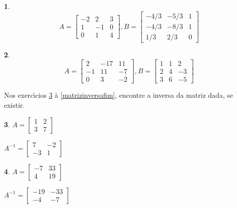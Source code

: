 \documentclass[12pt]{exam}
\newtheorem{exercicio}{}
\begin{document}
\begin{exercicio}
\[
  A =\begin{bmatrix}
    -2 & 2 & 3\\
    1 & -1 & 0\\
    0 & 1 & 4
  \end{bmatrix}, B =\begin{bmatrix}
    -4/3 & -5/3 & 1\\
    -4/3 & -8/3 & 1\\
    1/3 & 2/3 & 0
  \end{bmatrix}
\]
\end{exercicio}

\begin{exercicio}\label{matrizfim}
\[
  A =\begin{bmatrix}
    2 & -17 & 11\\
    -1 & 11 & -7\\
    0 & 3 & -2
  \end{bmatrix}, B =\begin{bmatrix}
    1 & 1 & 2\\
    2 & 4 & -3\\
    3 & 6 & -5
  \end{bmatrix}
\]
\end{exercicio}

Nos exerc{\'\i}cios \ref{matrizinversainicio} \`a \ref{matrizinversafim}, encontre a inversa da matriz dada, se existir.

\begin{exercicio}\label{matrizinversainicio}
$A =\begin{bmatrix}
    1 & 2\\
    3 & 7
  \end{bmatrix}$
\begin{solucao}
  $A^{-1} =\begin{bmatrix}
    7 & -2\\
    -3 & 1
  \end{bmatrix}$
\end{solucao}
\end{exercicio}

\begin{exercicio}
$A =\begin{bmatrix}
    -7 & 33\\
    4 & 19
  \end{bmatrix}$
\begin{solucao}
  $A^{-1} =\begin{bmatrix}
    -19 & -33\\
    -4 & -7
  \end{bmatrix}$
\end{solucao}
\end{exercicio}
\end{document}

